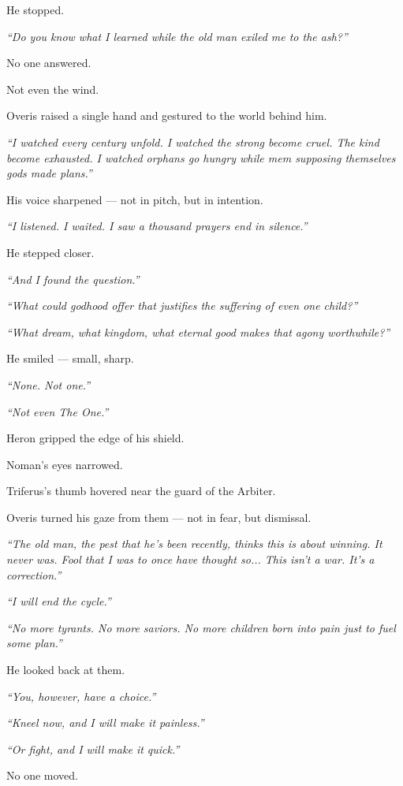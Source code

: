 \documentclass[12pt]{article}
\begin{document}
He stopped.

\textit{“Do you know what I learned while the old man exiled me to the ash?”}

No one answered.

Not even the wind.

Overis raised a single hand and gestured to the world behind him.

\textit{“I watched every century unfold. I watched the strong become cruel. The kind become exhausted. I watched orphans go hungry while mem supposing themselves gods made plans.”}

His voice sharpened — not in pitch, but in intention.

\textit{“I listened. I waited. I saw a thousand prayers end in silence.”}

He stepped closer.

\textit{“And I found the question.”}

\textit{“What could godhood offer that justifies the suffering of even one child?”}

\textit{“What dream, what kingdom, what eternal good makes that agony worthwhile?”}

He smiled — small, sharp.

\textit{“None. Not one.”}

\textit{“Not even The One.”}

\bigskip

Heron gripped the edge of his shield.

Noman’s eyes narrowed.

Triferus’s thumb hovered near the guard of the Arbiter.

Overis turned his gaze from them — not in fear, but dismissal.

\textit{“The old man, the pest that he's been recently, thinks this is about winning. It never was. Fool that I was to once have thought so... This isn’t a war. It’s a correction.”}

\textit{“I will end the cycle.”}

\textit{“No more tyrants. No more saviors. No more children born into pain just to fuel some plan.”}

He looked back at them.

\textit{“You, however, have a choice.”}

\textit{“Kneel now, and I will make it painless.”}

\textit{“Or fight, and I will make it quick.”}

No one moved.
\end{document}
